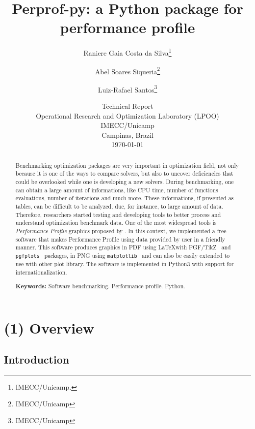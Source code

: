 \documentclass[10pt,a4paper]{article}
\begin{document}
\title{Perprof-py: a {P}ython package for performance profile}
\author{Raniere Gaia Costa da Silva\thanks{IMECC/Unicamp.} \and Abel Soares Siqueria\thanks{IMECC/Unicamp}  \and Luiz-Rafael Santos\thanks{IMECC/Unicamp}}
\date{Technical Report \\ Operational Research and Optimization Laboratory (LPOO) \\ IMECC/Unicamp \\ Campinas, Brazil \\ \today}
\maketitle

\begin{abstract}
Benchmarking optimization packages are very important in optimization field,
not only because it is one of the ways to compare solvers, but also to uncover
deficiencies that could be overlooked while one is developing a new solvers. During
benchmarking, one can obtain a large amount of  informations, like CPU time, number of functions
evaluations, number of iterations and much more. These informations, if presented
as tables, can be difficult to be analyzed, due, for instance, to large amount of data.
Therefore, researchers started testing and developing tools to better process and understand optimization benchmark 
data. One of the most widespread tools is \emph{ Performance Profile} graphics
proposed by \textcite{Dolan:2002du}. In this context, we implemented a free software that makes Performance Profile using data provided by user in a friendly manner. This software produces graphics in PDF using \LaTeX with PGF/TikZ~\cite{TikZ} and \texttt{pgfplots}~\cite{pgfplots} packages, in PNG using \texttt{matplotlib}~\cite{Hunter:2007}
and can also be easily extended to use with other plot library. The software is
implemented in Python3 with support for internationalization. %

\textbf{Keywords:} Software benchmarking. Performance profile. Python.
\end{abstract}

\section*{(1) Overview}

\subsection*{Introduction} 
\end{document}
